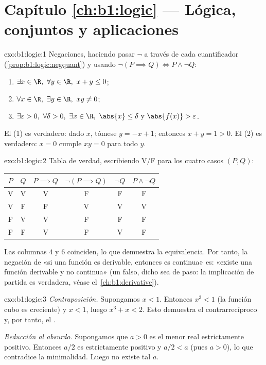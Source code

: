 \section*{Capítulo \ref{ch:b1:logic} --- Lógica, conjuntos y aplicaciones}

\begin{solution}{exo:b1:logic:1}
Negaciones, haciendo pasar $\lnot$ a través de cada cuantificador
(\cref{prop:b1:logic:negquant}) y usando $\lnot(P \implies Q) \iff
P \land \lnot Q$:
\begin{enumerate}
  \item $\exists x \in \R,\ \forall y \in \R,\ x + y \leq 0$;
  \item $\forall x \in \R,\ \exists y \in \R,\ xy \neq 0$;
  \item $\exists \varepsilon > 0,\ \forall \delta > 0,\ \exists x \in
        \R,\ \abs{x} \leq \delta \text{ y } \abs{f(x)} >
        \varepsilon$.
\end{enumerate}
El  (1) es verdadero: dado $x$, tómese $y = -x + 1$; entonces
$x + y = 1 > 0$. El  (2) es verdadero: $x = 0$ cumple $xy = 0$
para todo $y$.
\end{solution}

\begin{solution}{exo:b1:logic:2}
Tabla de verdad, escribiendo V/F para los cuatro casos $(P, Q)$:
\begin{center}
\begin{tabular}{cc|c|c|c|c}
$P$ & $Q$ & $P \implies Q$ & $\lnot(P \implies Q)$ & $\lnot Q$ &
$P \land \lnot Q$ \\
\hline
V & V & V & F & F & F \\
V & F & F & V & V & V \\
F & V & V & F & F & F \\
F & F & V & F & V & F \\
\end{tabular}
\end{center}
Las columnas $4$ y $6$ coinciden, lo que demuestra la equivalencia. Por
tanto, la negación de «si una función es derivable, entonces es
continua» es: «existe una función derivable y no continua» (un
 falso, dicho sea de paso: la implicación de partida es
verdadera, véase el~\cref{ch:b1:derivative}).
\end{solution}

\begin{solution}{exo:b1:logic:3}
\emph{Contraposición.} Supongamos $x < 1$. Entonces $x^3 < 1$ (la
función cubo es creciente) y $x < 1$, luego $x^3 + x < 2$. Esto
demuestra el contrarrecíproco y, por tanto, el .

\emph{Reducción al absurdo.} Supongamos que $a > 0$ es el menor real
estrictamente positivo. Entonces $a/2$ es estrictamente positivo y
$a/2 < a$ (pues $a > 0$), lo que contradice la minimalidad. Luego no
existe tal $a$.
\end{solution}


